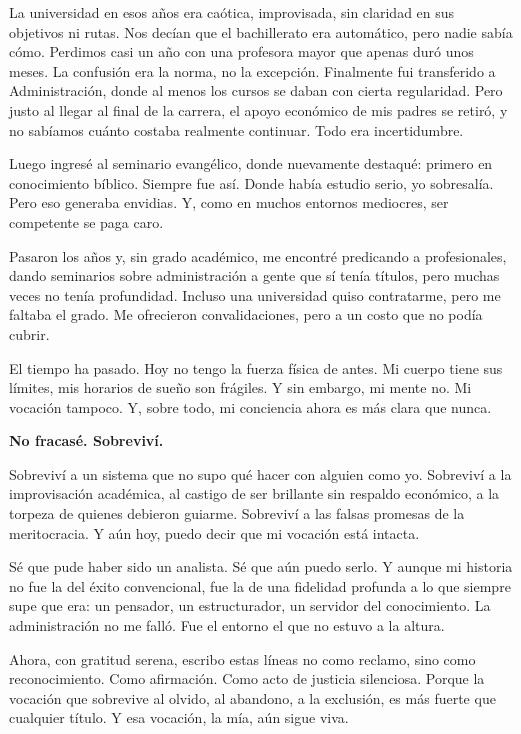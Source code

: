 \documentclass[a4paper,12pt]{article}
\begin{document}
La universidad en esos años era caótica, improvisada, sin claridad en sus objetivos ni rutas. Nos decían que el bachillerato era automático, pero nadie sabía cómo. Perdimos casi un año con una profesora mayor que apenas duró unos meses. La confusión era la norma, no la excepción. Finalmente fui transferido a Administración, donde al menos los cursos se daban con cierta regularidad. Pero justo al llegar al final de la carrera, el apoyo económico de mis padres se retiró, y no sabíamos cuánto costaba realmente continuar. Todo era incertidumbre.

Luego ingresé al seminario evangélico, donde nuevamente destaqué: primero en conocimiento bíblico. Siempre fue así. Donde había estudio serio, yo sobresalía. Pero eso generaba envidias. Y, como en muchos entornos mediocres, ser competente se paga caro.

Pasaron los años y, sin grado académico, me encontré predicando a profesionales, dando seminarios sobre administración a gente que sí tenía títulos, pero muchas veces no tenía profundidad. Incluso una universidad quiso contratarme, pero me faltaba el grado. Me ofrecieron convalidaciones, pero a un costo que no podía cubrir.

El tiempo ha pasado. Hoy no tengo la fuerza física de antes. Mi cuerpo tiene sus límites, mis horarios de sueño son frágiles. Y sin embargo, mi mente no. Mi vocación tampoco. Y, sobre todo, mi conciencia ahora es más clara que nunca.

\textbf{No fracasé. Sobreviví.}

Sobreviví a un sistema que no supo qué hacer con alguien como yo. Sobreviví a la improvisación académica, al castigo de ser brillante sin respaldo económico, a la torpeza de quienes debieron guiarme. Sobreviví a las falsas promesas de la meritocracia. Y aún hoy, puedo decir que mi vocación está intacta.

Sé que pude haber sido un analista. Sé que aún puedo serlo. Y aunque mi historia no fue la del éxito convencional, fue la de una fidelidad profunda a lo que siempre supe que era: un pensador, un estructurador, un servidor del conocimiento. La administración no me falló. Fue el entorno el que no estuvo a la altura.

Ahora, con gratitud serena, escribo estas líneas no como reclamo, sino como reconocimiento. Como afirmación. Como acto de justicia silenciosa. Porque la vocación que sobrevive al olvido, al abandono, a la exclusión, es más fuerte que cualquier título. Y esa vocación, la mía, aún sigue viva.

	
	
\end{document}
